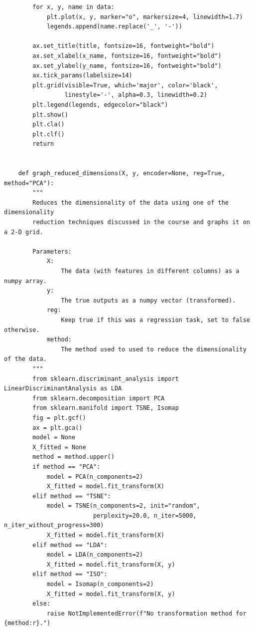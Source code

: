 \documentclass{article}
\begin{document}
\begin{verbatim}
        for x, y, name in data:
            plt.plot(x, y, marker="o", markersize=4, linewidth=1.7)
            legends.append(name.replace('_', '-'))
    
        ax.set_title(title, fontsize=16, fontweight="bold")
        ax.set_xlabel(x_name, fontsize=16, fontweight="bold")
        ax.set_ylabel(y_name, fontsize=16, fontweight="bold")
        ax.tick_params(labelsize=14)
        plt.grid(visible=True, which='major', color='black',
                 linestyle='-', alpha=0.3, linewidth=0.2)
        plt.legend(legends, edgecolor="black")
        plt.show()
        plt.cla()
        plt.clf()
        return
    
    
    def graph_reduced_dimensions(X, y, encoder=None, reg=True, method="PCA"):
        """
        Reduces the dimensionality of the data using one of the dimensionality
        reduction techniques discussed in the course and graphs it on a 2-D grid.
    
        Parameters:
            X:
                The data (with features in different columns) as a numpy array.
            y:
                The true outputs as a numpy vector (transformed).
            reg:
                Keep true if this was a regression task, set to false otherwise.
            method:
                The method used to used to reduce the dimensionality of the data.
        """
        from sklearn.discriminant_analysis import LinearDiscriminantAnalysis as LDA
        from sklearn.decomposition import PCA
        from sklearn.manifold import TSNE, Isomap
        fig = plt.gcf()
        ax = plt.gca()
        model = None
        X_fitted = None
        method = method.upper()
        if method == "PCA":
            model = PCA(n_components=2)
            X_fitted = model.fit_transform(X)
        elif method == "TSNE":
            model = TSNE(n_components=2, init="random",
                         perplexity=20.0, n_iter=5000, n_iter_without_progress=300)
            X_fitted = model.fit_transform(X)
        elif method == "LDA":
            model = LDA(n_components=2)
            X_fitted = model.fit_transform(X, y)
        elif method == "ISO":
            model = Isomap(n_components=2)
            X_fitted = model.fit_transform(X, y)
        else:
            raise NotImplementedError(f"No transformation method for {method:r}.")
    

\end{verbatim}
\end{document}
